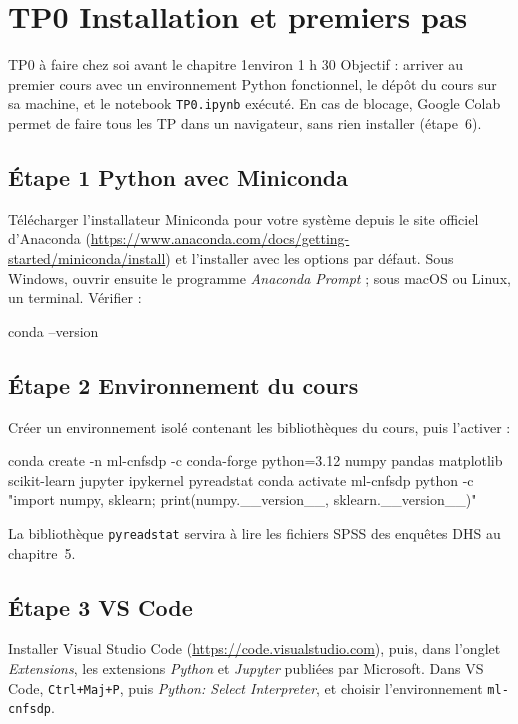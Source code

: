 \section{TP0 \textendash{} Installation et premiers pas}
\label{sec:tp0}

\begin{tp}{TP0 \textendash{} à faire chez soi avant le chapitre 1}{environ 1 h 30 \textperiodcentered{} \texttt{\cnfDepot}}
Objectif : arriver au premier cours avec un environnement Python fonctionnel, le dépôt du cours sur sa machine, et le notebook \texttt{TP0.ipynb} exécuté.
En cas de blocage, Google Colab permet de faire tous les TP dans un navigateur, sans rien installer (étape~6).
\end{tp}

\subsection*{Étape 1 \textendash{} Python avec Miniconda}
Télécharger l'installateur Miniconda pour votre système depuis le site officiel d'Anaconda (\url{https://www.anaconda.com/docs/getting-started/miniconda/install}) et l'installer avec les options par défaut.
Sous Windows, ouvrir ensuite le programme \emph{Anaconda Prompt} ; sous macOS ou Linux, un terminal. Vérifier :
\begin{terminal}
conda --version
\end{terminal}

\subsection*{Étape 2 \textendash{} Environnement du cours}
Créer un environnement isolé contenant les bibliothèques du cours, puis l'activer :
\begin{terminal}
conda create -n ml-cnfsdp -c conda-forge python=3.12 numpy pandas matplotlib scikit-learn jupyter ipykernel pyreadstat
conda activate ml-cnfsdp
python -c "import numpy, sklearn; print(numpy.__version__, sklearn.__version__)"
\end{terminal}
La bibliothèque \texttt{pyreadstat} servira à lire les fichiers SPSS des enquêtes DHS au chapitre~5.

\subsection*{Étape 3 \textendash{} VS Code}
Installer Visual Studio Code (\url{https://code.visualstudio.com}), puis, dans l'onglet \emph{Extensions}, les extensions \emph{Python} et \emph{Jupyter} publiées par Microsoft.
Dans VS Code, \texttt{Ctrl+Maj+P}, puis \emph{Python: Select Interpreter}, et choisir l'environnement \texttt{ml-cnfsdp}.

